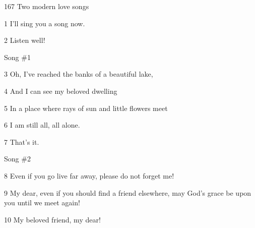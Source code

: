 
167 Two modern love songs

1 I'll sing you a song now.

2 Listen well!

Song \#1

3 Oh, I've reached the banks of a beautiful lake,

4 And I can see my beloved dwelling

5 In a place where rays of sun and little flowers meet

6 I am still all, all alone.

7 That's it.

Song \#2

8 Even if you go live far away, please do not forget me!

9 My dear, even if you should find a friend elsewhere, may God's grace be upon
you until we meet again!

10 My beloved friend, my dear!


